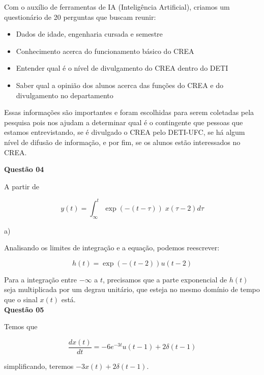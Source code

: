 Com o auxílio de ferramentas de IA (Inteligência Artificial), criamos um questionário de 20 perguntas que buscam reunir:

\begin{itemize}
    \item Dados de idade, engenharia cursada e semestre
    \item Conhecimento acerca do funcionamento básico do CREA
    \item Entender qual é o nível de divulgamento do CREA dentro do DETI
    \item Saber qual a opinião dos alunos acerca das funções do CREA e do divulgamento no departamento
\end{itemize}

Essas informações são importantes e foram escolhidas para serem coletadas pela pesquisa pois nos ajudam a determinar qual é o contingente que pessoas que estamos entrevistando, se é divulgado o CREA pelo DETI-UFC, se há algum nível de difusão de informação, e por fim, se os alunos estão interessados no CREA.


\newpage

\textbf{Questão 04} 

A partir de

\begin{equation}
    y(t) = \int_\infty ^t \exp{(-(t-\tau))} \;x(\tau - 2)d\tau
\end{equation}

a) 

Analisando os limites de integração e a equação, podemos reescrever:

\begin{equation}
    h(t) = \exp{(-(t-2))}u(t-2)
\end{equation}

Para a integração entre $-\infty$ a $t$, precisamos  que a parte exponencial de $h(t)$ seja multiplicada por um degrau unitário, que esteja no 
mesmo domínio de tempo que o sinal $x(t)$ está.\\



\newpage
\textbf{Questão 05}

Temos que 

\begin{equation}
    \frac{dx(t)}{dt} = -6e^ {-3t}u(t-1) + 2\delta(t-1)
\end{equation}


simplificando, teremos
$-3x(t) + 2\delta(t-1)$.\\

